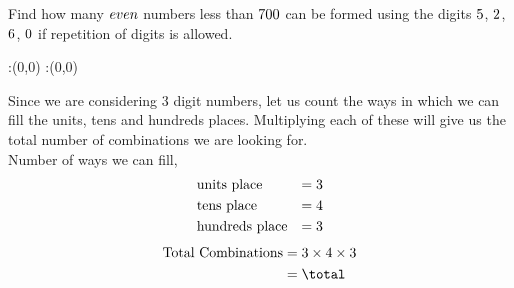 \gcalcexpr[0]{\total}{\vbeight * \vbsix}

\question[2] Find how many $even$ numbers less than $700$ can be 
 formed using the digits $5$, $2$, $6$, $0$ if
 repetition of digits is allowed.


\watchout

\ifprintanswers
  \begin{marginfigure}
      :(0,0)
      :(0,0)
    \figdrawbegin{}
      \figdrawline [100,101]
    \figdrawend
    \figvisu{\figBoxA}{}{%
    }
    \centerline{\box\figBoxA}
  \end{marginfigure}
\fi 

\begin{solution}[\mcq]
  Since we are considering 3 digit numbers, let us count the ways in which
  we can fill the units, tens and hundreds places. Multiplying each of these
  will give us the total number of combinations we are looking for. \\
  Number of ways we can fill,
  \begin{align}
    &\text{units place}    &= 3 \\
    &\text{tens place}     &= 4 \\
    &\text{hundreds place} &= 3
  \end{align}
  \begin{align}
    \text{Total Combinations} &= \vbeight\times 4\times \vbsix \\
                              &= \total
  \end{align}
\end{solution}
